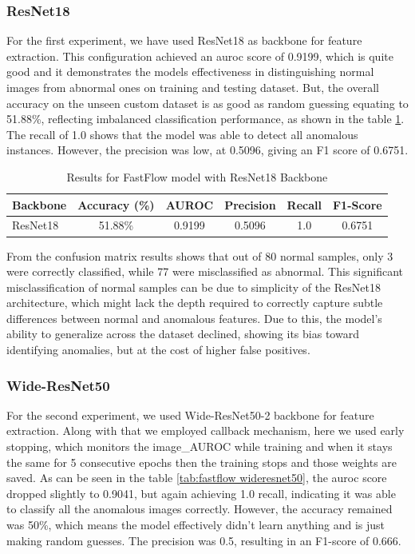 \subsubsection*{ResNet18}

For the first experiment, we have used ResNet18 as backbone for feature extraction. This configuration achieved an \gls{auroc} score of 0.9199, which is quite good and it demonstrates the models effectiveness in distinguishing normal images from abnormal ones on training and testing dataset. But, the overall accuracy on the unseen custom dataset is as good as random guessing equating to 51.88\%, reflecting imbalanced classification performance, as shown in the table \ref{tab:fastflow resnet18}. The recall of 1.0 shows that the model was able to detect all anomalous instances. However, the precision was low, at 0.5096, giving an F1 score of 0.6751. 

\begin{table}[ht!]
    \centering
    \begin{tabular}{|l|c|c|c|c|c|}
        \hline
        \textbf{Backbone} & \textbf{Accuracy (\%)} & \textbf{AUROC} & \textbf{Precision} & \textbf{Recall} & \textbf{F1-Score} \\ \hline
        ResNet18 & 51.88\% & 0.9199 & 0.5096 & 1.0 & 0.6751 \\ \hline
    \end{tabular}
    \caption{Results for FastFlow model with ResNet18 Backbone}
    \label{tab:fastflow resnet18}
\end{table}

From the confusion matrix results shows that out of 80 normal samples, only 3 were correctly classified, while 77 were misclassified as abnormal. This significant misclassification of normal samples can be due to simplicity of the ResNet18 architecture, which might lack the depth required to correctly capture subtle differences between normal and anomalous features. Due to this, the model’s ability to generalize across the dataset declined, showing its bias toward identifying anomalies, but at the cost of higher false positives.

\subsubsection*{Wide-ResNet50}

For the second experiment, we used Wide-ResNet50-2 backbone for feature extraction. Along with that we employed callback mechanism, here we used early stopping, which monitors the image\_AUROC while training and when it stays the same for 5 consecutive epochs then the training stops and those weights are saved. As can be seen in the table \ref{tab:fastflow wideresnet50}, the \gls{auroc} score dropped slightly to 0.9041, but again achieving 1.0 recall, indicating it was able to classify all the anomalous images correctly. However, the accuracy remained was 50\%, which means the model effectively didn't learn anything and is just making random guesses. The precision was 0.5, resulting in an F1-score of 0.666.

